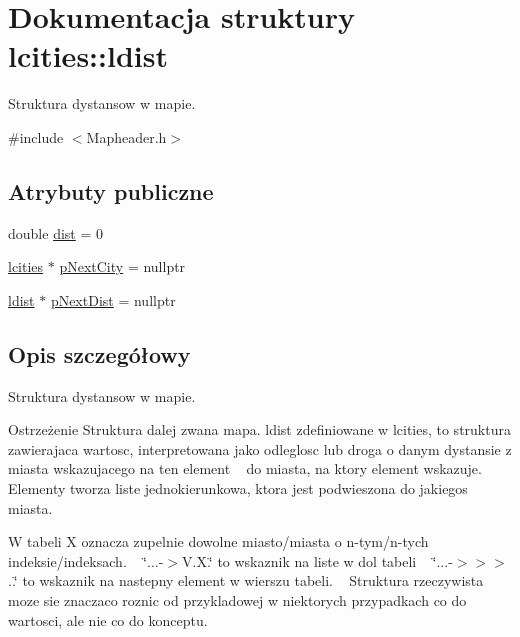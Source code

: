 \hypertarget{structlcities_1_1ldist}{}\section{Dokumentacja struktury lcities\+:\+:ldist}
\label{structlcities_1_1ldist}


Struktura dystansow w mapie.  




{\ttfamily \#include $<$Mapheader.\+h$>$}

\subsection*{Atrybuty publiczne}
\begin{DoxyCompactItemize}
\item 
double \mbox{\hyperlink{structlcities_1_1ldist_a7bd7a2a51dcb4918af11c8f6da7191d5}{dist}} = 0
\item 
\mbox{\hyperlink{structlcities}{lcities}} $\ast$ \mbox{\hyperlink{structlcities_1_1ldist_ab6641f5f7e8a9b3f5bee7ad9be7d3ecb}{p\+Next\+City}} = nullptr
\item 
\mbox{\hyperlink{structlcities_1_1ldist}{ldist}} $\ast$ \mbox{\hyperlink{structlcities_1_1ldist_af615449e5ee90bff344ca3169a3c1c7b}{p\+Next\+Dist}} = nullptr
\end{DoxyCompactItemize}


\subsection{Opis szczegółowy}
Struktura dystansow w mapie. 

\begin{DoxyWarning}{Ostrzeżenie}
Struktura dalej zwana mapa. ldist zdefiniowane w lcities, to struktura zawierajaca wartosc, interpretowana jako odleglosc lub droga o danym dystansie z miasta wskazujacego na ten element ~\newline
 do miasta, na ktory element wskazuje. Elementy tworza liste jednokierunkowa, ktora jest podwieszona do jakiegos miasta. 

W tabeli X oznacza zupelnie dowolne miasto/miasta o n-\/tym/n-\/tych indeksie/indeksach. ~\newline
 \char`\"{}...-\/$>$\+V.\+X.\char`\"{} to wskaznik na liste w dol tabeli ~\newline
 \char`\"{}...-\/$>$$>$$>$..\char`\"{} to wskaznik na nastepny element w wierszu tabeli. ~\newline
 Struktura rzeczywista moze sie znaczaco roznic od przykladowej w niektorych przypadkach co do wartosci, ale nie co do konceptu. 
\end{DoxyWarning}


